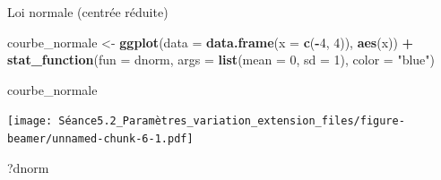 \documentclass[ignorenonframetext,]{beamer}
\newenvironment{Shaded}{\begin{snugshade}}{\end{snugshade}}
\newcommand{\KeywordTok}[1]{\textcolor[rgb]{0.13,0.29,0.53}{\textbf{#1}}}
\newcommand{\DataTypeTok}[1]{\textcolor[rgb]{0.13,0.29,0.53}{#1}}
\newcommand{\DecValTok}[1]{\textcolor[rgb]{0.00,0.00,0.81}{#1}}
\newcommand{\StringTok}[1]{\textcolor[rgb]{0.31,0.60,0.02}{#1}}
\newcommand{\OperatorTok}[1]{\textcolor[rgb]{0.81,0.36,0.00}{\textbf{#1}}}
\newcommand{\NormalTok}[1]{#1}
\begin{document}
\begin{frame}[fragile]{Loi normale (centrée réduite)}

\begin{Shaded}
\begin{Highlighting}[]
\NormalTok{courbe_normale <-}\StringTok{ }
\StringTok{  }\KeywordTok{ggplot}\NormalTok{(}\DataTypeTok{data =} \KeywordTok{data.frame}\NormalTok{(}\DataTypeTok{x =} \KeywordTok{c}\NormalTok{(}\OperatorTok{-}\DecValTok{4}\NormalTok{, }\DecValTok{4}\NormalTok{)), }\KeywordTok{aes}\NormalTok{(x)) }\OperatorTok{+}
\StringTok{  }\KeywordTok{stat_function}\NormalTok{(}\DataTypeTok{fun =}\NormalTok{ dnorm, }\DataTypeTok{args =} \KeywordTok{list}\NormalTok{(}\DataTypeTok{mean =} \DecValTok{0}\NormalTok{, }\DataTypeTok{sd =} \DecValTok{1}\NormalTok{), }\DataTypeTok{color =} \StringTok{"blue"}\NormalTok{) }

\NormalTok{courbe_normale}
\end{Highlighting}
\end{Shaded}

\texttt{[image: Séance5.2\_Paramètres\_variation\_extension\_files/figure-beamer/unnamed-chunk-6-1.pdf]}

\begin{Shaded}
\begin{Highlighting}[]
\NormalTok{?dnorm}
\end{Highlighting}
\end{Shaded}

\end{frame}
\end{document}
